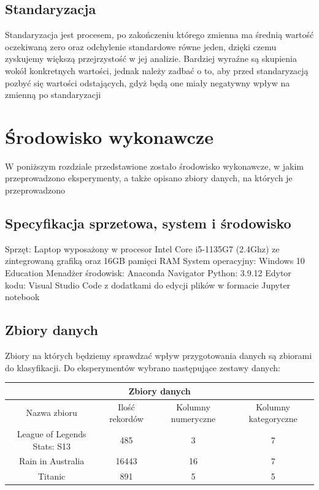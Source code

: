 \documentclass{book}
\begin{document}
\section{Standaryzacja}
Standaryzacja jest procesem, po zakończeniu którego zmienna 
ma średnią wartość oczekiwaną zero oraz odchylenie standardowe 
równe jeden, dzięki czemu zyskujemy większą przejrzystość w 
jej analizie. Bardziej wyraźne są skupienia wokół konkretnych 
wartości, jednak należy zadbać o to, aby przed standaryzacją 
pozbyć się wartości odstających, gdyż będą one miały negatywny 
wpływ na zmienną po standaryzacji



\chapter{Środowisko wykonawcze}

W poniższym rozdziale przedstawione zostało środowisko wykonawcze, 
w jakim przeprowadzono eksperymenty, a także opisano zbiory danych, 
na których je przeprowadzono
\section{Specyfikacja sprzetowa, system i środowisko}
Sprzęt: Laptop wyposażony w procesor Intel Core i5-1135G7 
(2.4Ghz) ze zintegrowaną grafiką oraz 16GB pamięci RAM
System operacyjny: Windows 10 Education
Menadżer środowisk: Anaconda Navigator
Python: 3.9.12
Edytor kodu: Visual Studio Code z dodatkami do edycji plików w 
formacie Jupyter notebook
\section{Zbiory danych}
Zbiory na których będziemy sprawdzać wpływ przygotowania danych 
są zbiorami do klasyfikacji. Do eksperymentów wybrano następujące 
zestawy danych:

\begin{center}
    \begin{tabular}{ |c|c|c|c| } 
    \hline
    \multicolumn{4}{|c|}{Zbiory danych} \\
    \hline
    Nazwa zbioru & Ilość rekordów & Kolumny numeryczne & Kolumny kategoryczne \\
     \hline
     League of Legends Stats: S13\cite{lol_stats_dataset} & 485 & 3 & 7\\ 
     Rain in Australia\cite{australian_rain_dataset} & 16443 & 16 & 7\\ 
     Titanic\cite{titanic_dataset} & 891 & 5 & 5\\ 
     \hline
    \end{tabular}
    \end{center}
\end{document}
